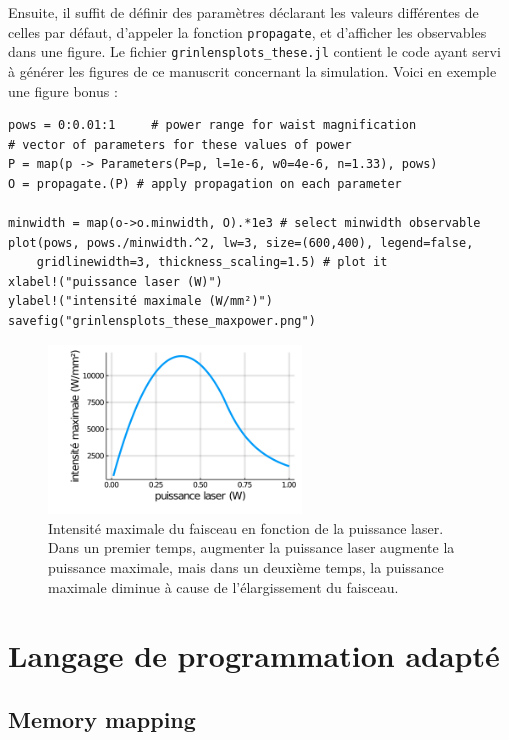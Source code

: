 Ensuite, il suffit de définir des paramètres déclarant les valeurs différentes de celles par défaut, d'appeler la fonction \verb|propagate|, et d'afficher les observables dans une figure. Le fichier \verb|grinlensplots_these.jl| contient le code ayant servi à générer les figures de ce manuscrit concernant la simulation. Voici en exemple une figure bonus :

\juliastyle
\begin{lstlisting}
pows = 0:0.01:1     # power range for waist magnification
# vector of parameters for these values of power
P = map(p -> Parameters(P=p, l=1e-6, w0=4e-6, n=1.33), pows)
O = propagate.(P) # apply propagation on each parameter

minwidth = map(o->o.minwidth, O).*1e3 # select minwidth observable
plot(pows, pows./minwidth.^2, lw=3, size=(600,400), legend=false,
    gridlinewidth=3, thickness_scaling=1.5) # plot it
xlabel!("puissance laser (W)")
ylabel!("intensité maximale (W/mm²)")
savefig("grinlensplots_these_maxpower.png")
\end{lstlisting}

\begin{figure}
    \centering
    \includegraphics[width=0.6\textwidth]{./files/grinlensplots_these_maxpower.png}
    \caption{Intensité maximale du faisceau en fonction de la puissance laser. Dans un premier temps, augmenter la puissance laser augmente la puissance maximale, mais dans un deuxième temps, la puissance maximale diminue à cause de l'élargissement du faisceau.
    \label{AppFIGmaxintensity}}
    \end{figure}


\section{Langage de programmation adapté}

\subsection{Memory mapping}

